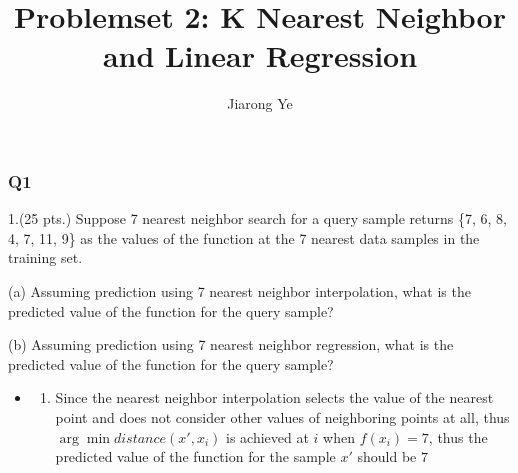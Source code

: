 \documentclass[11pt]{article}
\title{Problemset 2: K Nearest Neighbor and Linear
Regression}
\author{Jiarong Ye}
\providecommand{\tightlist}{%
      \setlength{\itemsep}{0pt}\setlength{\parskip}{0pt}}
\begin{document}
    
    
    \maketitle
    
    

    \subsubsection*{Q1}\label{q1}

    1.(25 pts.) Suppose 7 nearest neighbor search for a query sample returns
\{7, 6, 8, 4, 7, 11, 9\} as the values of the function at the 7 nearest
data samples in the training set.

(a) Assuming prediction using 7 nearest neighbor interpolation, what is
    the predicted value of the function for the query sample?

(b) Assuming prediction using 7 nearest neighbor regression, what is the
    predicted value of the function for the query sample?


    \begin{itemize}
\item
  \begin{enumerate}
  \def\labelenumi{(\alph{enumi})}
  \tightlist
  \item
    Since the nearest neighbor interpolation selects the value of the
    nearest point and does not consider other values of neighboring points
    at all, thus \(\arg \min distance(x', x_i)\) is achieved at \(i\)
    when \(f(x_i)=7\), thus the predicted value of the function for the
    sample \(x'\) should be \(7\)
  \end{enumerate}
\end{itemize}
\end{document}
